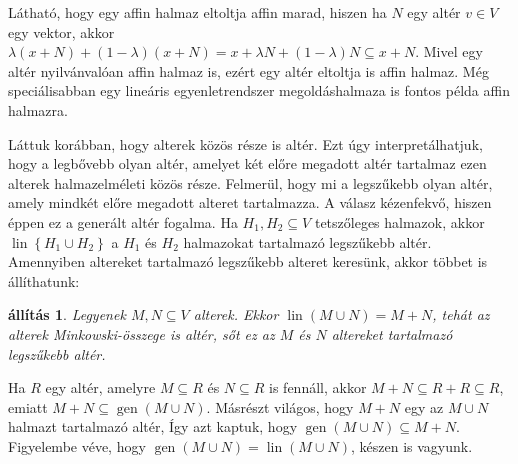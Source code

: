 \documentclass[9pt, a4paper, showtrims]{memoir}
\makeatletter
\renewenvironment{proof}[1][\proofname]
    {\par\pushQED{\qed}%
    \normalfont \topsep6\p@\@plus6\p@\relax
    \trivlist
    \item[\hskip\labelsep
        \itshape
    #1\@addpunct{:}]\ignorespaces}
    {\popQED\endtrivlist\@endpefalse}
\theoremstyle{plain}
\newtheorem{proposition}{állítás}[chapter]
\theoremstyle{remark}
\theoremstyle{definition}
\DeclareMathOperator{\lin}{lin}
\DeclareMathOperator{\gen}{gen}
\makeatother
\begin{document}
Látható, hogy egy affin halmaz eltoltja affin marad,
hiszen ha 
 $N$ egy altér $v\in V$ egy vektor,
akkor
$
\lambda\left( x+N \right)+\left( 1-\lambda \right)\left( x+N \right)
=
x+\lambda N+\left( 1-\lambda \right)N
\subseteq
x+N
$.
Mivel egy altér nyilvánvalóan affin halmaz is, 
ezért egy altér eltoltja is affin halmaz. 
Még speciálisabban egy lineáris egyenletrendszer megoldáshalmaza is fontos példa affin halmazra.

Láttuk korábban, hogy alterek közös része is altér.
Ezt úgy interpretálhatjuk, hogy a legbővebb olyan altér,
amelyet két előre megadott altér tartalmaz ezen alterek halmazelméleti közös része.
Felmerül, hogy mi a legszűkebb olyan altér, amely mindkét előre megadott alteret tartalmazza.
A válasz kézenfekvő, hiszen éppen ez a generált altér fogalma.
Ha $H_1,H_2\subseteq V$ tetszőleges halmazok, akkor 
$\lin\left\{ H_1\cup H_2 \right\}$ a $H_1$ és $H_2$ halmazokat tartalmazó legszűkebb altér.
Amennyiben altereket tartalmazó legszűkebb alteret keresünk,
akkor többet is állíthatunk:
\begin{proposition}
    Legyenek $M,N\subseteq V$ alterek.
    Ekkor 
    $\lin(M\cup N)=M+N$,
    tehát az alterek Minkowski-összege is altér, sőt ez az $M$ és $N$ altereket tartalmazó
    legszűkebb altér.
\end{proposition}
\begin{proof}
    Ha $R$ egy altér, amelyre $M\subseteq R$ és $N\subseteq R$ is fennáll,
    akkor $M+N\subseteq R+R\subseteq R$, emiatt 
    $M+N\subseteq \gen(M\cup N)$.
    Másrészt világos, hogy $M+N$ egy az $M\cup N$ halmazt tartalmazó altér, 
    Így azt kaptuk, hogy 
    \begin{math}
        \gen(M\cup N)\subseteq M+N.
    \end{math}
    Figyelembe véve, hogy $\gen(M\cup N)=\lin(M\cup N)$, 
    készen is vagyunk.
\end{proof}
\end{document}
